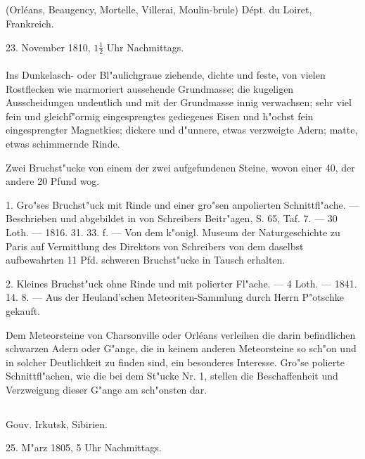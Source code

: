 \documentclass[a4paper, 11pt, oneside, polutonikogreek, german]{article}
\begin{document}
\subsection{}
\begin{center}

(Orléans, Beaugency, Mortelle, Villerai, Moulin-brule) Dépt. du Loiret, Frankreich.

23. November 1810, $1\frac{1}{2}$ Uhr Nachmittags.
\end{center}
\paragraph{}
Ins Dunkelasch- oder Bl"aulichgraue ziehende, dichte und feste, von vielen Rostflecken wie marmoriert aussehende Grundmasse; die kugeligen Ausscheidungen undeutlich und mit der Grundmasse innig verwachsen; sehr viel fein und gleichf"ormig eingesprengtes gediegenes Eisen und h"ochst fein eingesprengter Magnetkies; dickere und d"unnere, etwas verzweigte Adern; matte, etwas schimmernde Rinde.

Zwei Bruchst"ucke von einem der zwei aufgefundenen Steine, wovon einer 40, der andere 20 Pfund wog.

1. Gro"ses Bruchst"uck mit Rinde und einer gro"sen anpolierten Schnittfl"ache. --- Beschrieben und abgebildet in von Schreibers Beitr"agen, S. 65, Taf. 7. --- 30 Loth. --- 1816. 31. 33. f. --- Von dem k"onigl. Museum der Naturgeschichte zu Paris auf Vermittlung des Direktors von Schreibers von dem daselbst aufbewahrten 11 Pfd. schweren Bruchst"ucke in Tausch erhalten.

2. Kleines Bruchst"uck ohne Rinde und mit polierter Fl"ache. --- 4 Loth. --- 1841. 14. 8. --- Aus der Heuland'schen Meteoriten-Sammlung durch Herrn P"otschke gekauft.

\setlength{\leftskip}{10mm}
\setlength{\parindent}{0pt}

{\footnotesize Dem Meteorsteine von Charsonville oder Orléans verleihen die darin befindlichen schwarzen Adern oder G"ange, die in keinem anderen Meteorsteine so sch"on und in solcher Deutlichkeit zu finden sind, ein besonderes Interesse. Gro"se polierte Schnittfl"achen, wie die bei dem St"ucke Nr. 1, stellen die Beschaffenheit und Verzweigung dieser G"ange am sch"onsten dar.}

\setlength{\leftskip}{0pt}
\setlength{\parindent}{20pt}

\subsection{}
\begin{center}

Gouv. Irkutsk, Sibirien.

25. M"arz 1805, 5 Uhr Nachmittags.
\end{center}
\end{document}
